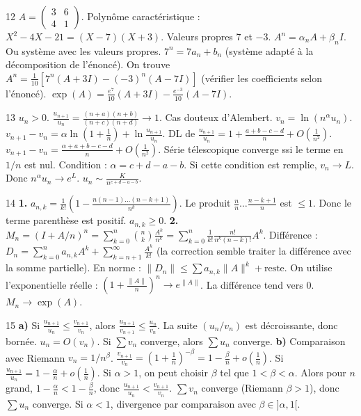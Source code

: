 \begin{correction}{12}
$A = \begin{pmatrix} 3 & 6 \\ 4 & 1 \end{pmatrix}$. Polynôme caractéristique : $X^2 - 4X - 21 = (X-7)(X+3)$.
Valeurs propres $7$ et $-3$.
$A^n = \alpha_n A + \beta_n I$. Ou système avec les valeurs propres.
$7^n = 7a_n + b_n$ (système adapté à la décomposition de l'énoncé).
On trouve $A^n = \frac{1}{10} [ 7^n (A+3I) - (-3)^n (A-7I) ]$ (vérifier les coefficients selon l'énoncé).
$\exp(A) = \frac{e^7}{10}(A+3I) - \frac{e^{-3}}{10}(A-7I)$.
\end{correction}

\begin{correction}{13}
$u_n > 0$. $\frac{u_{n+1}}{u_n} = \frac{(n+a)(n+b)}{(n+c)(n+d)} \to 1$. Cas douteux d'Alembert.
$v_n = \ln(n^\alpha u_n)$.
$v_{n+1}-v_n = \alpha \ln(1+\frac{1}{n}) + \ln \frac{u_{n+1}}{u_n}$.
DL de $\frac{u_{n+1}}{u_n} = 1 + \frac{a+b-c-d}{n} + O(\frac{1}{n^2})$.
$v_{n+1}-v_n = \frac{\alpha + a+b-c-d}{n} + O(\frac{1}{n^2})$.
Série télescopique converge ssi le terme en $1/n$ est nul.
Condition : $\alpha = c+d-a-b$.
Si cette condition est remplie, $v_n \to L$.
Donc $n^\alpha u_n \to e^L$.
$u_n \sim \frac{K}{n^{c+d-a-b}}$.
\end{correction}

\begin{correction}{14}
\textbf{1.} $a_{n,k} = \frac{1}{k!} (1 - \frac{n(n-1)\dots(n-k+1)}{n^k})$.
Le produit $\frac{n}{n} \dots \frac{n-k+1}{n}$ est $\le 1$. Donc le terme parenthèse est positif. $a_{n,k} \ge 0$.
\textbf{2.} $M_n = (I + A/n)^n = \sum_{k=0}^n \binom{n}{k} \frac{A^k}{n^k} = \sum_{k=0}^n \frac{1}{k!} \frac{n!}{n^k(n-k)!} A^k$.
Différence : $D_n = \sum_{k=0}^n a_{n,k} A^k + \sum_{k=n+1}^\infty \frac{A^k}{k!}$ (la correction semble traiter la différence avec la somme partielle).
En norme : $\|D_n\| \le \sum a_{n,k} \|A\|^k + \text{reste}$.
On utilise l'exponentielle réelle : $(1+\frac{\|A\|}{n})^n \to e^{\|A\|}$.
La différence tend vers 0. $M_n \to \exp(A)$.
\end{correction}

\begin{correction}{15}
\textbf{a)} Si $\frac{u_{n+1}}{u_n} \le \frac{v_{n+1}}{v_n}$, alors $\frac{u_{n+1}}{v_{n+1}} \le \frac{u_n}{v_n}$.
La suite $(u_n/v_n)$ est décroissante, donc bornée. $u_n = O(v_n)$.
Si $\sum v_n$ converge, alors $\sum u_n$ converge.
\textbf{b)} Comparaison avec Riemann $v_n = 1/n^\beta$.
$\frac{v_{n+1}}{v_n} = (1+\frac{1}{n})^{-\beta} = 1 - \frac{\beta}{n} + o(\frac{1}{n})$.
Si $\frac{u_{n+1}}{u_n} = 1 - \frac{\alpha}{n} + o(\frac{1}{n})$.
Si $\alpha > 1$, on peut choisir $\beta$ tel que $1 < \beta < \alpha$.
Alors pour $n$ grand, $1 - \frac{\alpha}{n} < 1 - \frac{\beta}{n}$, donc $\frac{u_{n+1}}{u_n} < \frac{v_{n+1}}{v_n}$.
$\sum v_n$ converge (Riemann $\beta>1$), donc $\sum u_n$ converge.
Si $\alpha < 1$, divergence par comparaison avec $\beta \in ]\alpha, 1[$.
\end{correction}

